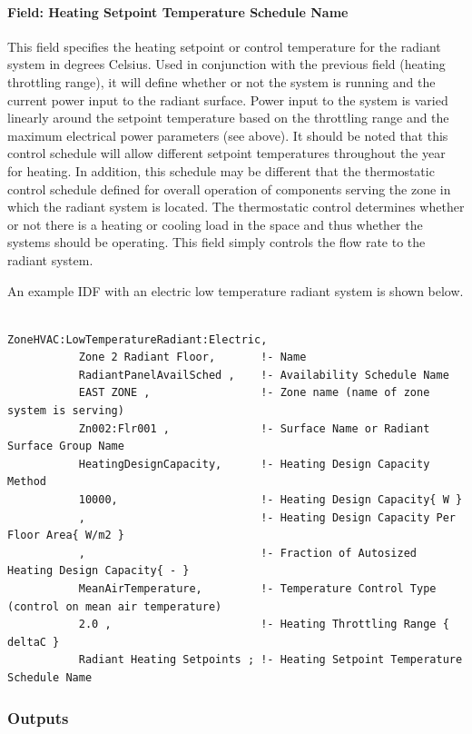 \paragraph{Field: Heating Setpoint Temperature Schedule Name}\label{field-heating-setpoint-temperature-schedule-name}

This field specifies the heating setpoint or control temperature for the radiant system in degrees Celsius. Used in conjunction with the previous field (heating throttling range), it will define whether or not the system is running and the current power input to the radiant surface. Power input to the system is varied linearly around the setpoint temperature based on the throttling range and the maximum electrical power parameters (see above). It should be noted that this control schedule will allow different setpoint temperatures throughout the year for heating. In addition, this schedule may be different that the thermostatic control schedule defined for overall operation of components serving the zone in which the radiant system is located. The thermostatic control determines whether or not there is a heating or cooling load in the space and thus whether the systems should be operating. This field simply controls the flow rate to the radiant system.

An example IDF with an electric low temperature radiant system is shown below.

\begin{lstlisting}

ZoneHVAC:LowTemperatureRadiant:Electric,
           Zone 2 Radiant Floor,       !- Name
           RadiantPanelAvailSched ,    !- Availability Schedule Name
           EAST ZONE ,                 !- Zone name (name of zone system is serving)
           Zn002:Flr001 ,              !- Surface Name or Radiant Surface Group Name
           HeatingDesignCapacity,      !- Heating Design Capacity Method
           10000,                      !- Heating Design Capacity{ W }
           ,                           !- Heating Design Capacity Per Floor Area{ W/m2 }
           ,                           !- Fraction of Autosized Heating Design Capacity{ - }
           MeanAirTemperature,         !- Temperature Control Type (control on mean air temperature)
           2.0 ,                       !- Heating Throttling Range { deltaC }
           Radiant Heating Setpoints ; !- Heating Setpoint Temperature Schedule Name
\end{lstlisting}

\subsubsection{Outputs}\label{outputs-7-007}

